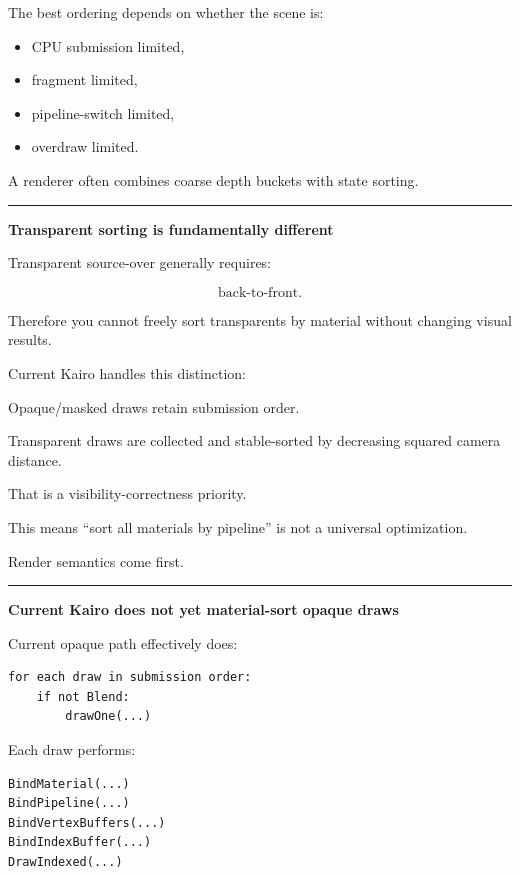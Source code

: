 The best ordering depends on whether the scene is:

\begin{itemize}
\tightlist
\item
  CPU submission limited,
\item
  fragment limited,
\item
  pipeline-switch limited,
\item
  overdraw limited.
\end{itemize}

A renderer often combines coarse depth buckets with state sorting.

\begin{center}\rule{0.5\linewidth}{0.5pt}\end{center}

\textbf{Transparent sorting is fundamentally different}

Transparent source-over generally requires:

\[
\text{back-to-front}.
\]

Therefore you cannot freely sort transparents by material without changing visual results.

Current Kairo handles this distinction:

Opaque/masked draws retain submission order.

Transparent draws are collected and stable-sorted by decreasing squared camera distance.

That is a visibility-correctness priority.

This means ``sort all materials by pipeline'' is not a universal optimization.

Render semantics come first.

\begin{center}\rule{0.5\linewidth}{0.5pt}\end{center}

\textbf{Current Kairo does not yet material-sort opaque draws}

Current opaque path effectively does:

\begin{verbatim}
for each draw in submission order:
    if not Blend:
        drawOne(...)
\end{verbatim}

Each draw performs:

\begin{verbatim}
BindMaterial(...)
BindPipeline(...)
BindVertexBuffers(...)
BindIndexBuffer(...)
DrawIndexed(...)
\end{verbatim}

